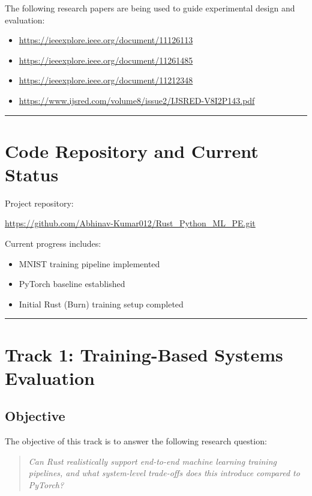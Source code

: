 \documentclass{ieeeaccess}
\begin{document}
The following research papers are being used to guide experimental design and evaluation:

\begin{itemize}
    \item \url{https://ieeexplore.ieee.org/document/11126113}
    \item \url{https://ieeexplore.ieee.org/document/11261485}
    \item \url{https://ieeexplore.ieee.org/document/11212348}
    \item \url{https://www.ijsred.com/volume8/issue2/IJSRED-V8I2P143.pdf}
\end{itemize}

\hrule

\section{Code Repository and Current Status}

Project repository:
\begin{center}
\url{https://github.com/Abhinav-Kumar012/Rust_Python_ML_PE.git}
\end{center}

Current progress includes:
\begin{itemize}
    \item MNIST training pipeline implemented
    \item PyTorch baseline established
    \item Initial Rust (Burn) training setup completed
\end{itemize}

\hrule

\section{Track 1: Training-Based Systems Evaluation}

\subsection{Objective}

The objective of this track is to answer the following research question:

\begin{quote}
\textit{Can Rust realistically support end-to-end machine learning training pipelines, and what system-level trade-offs does this introduce compared to PyTorch?}
\end{quote}
\end{document}
